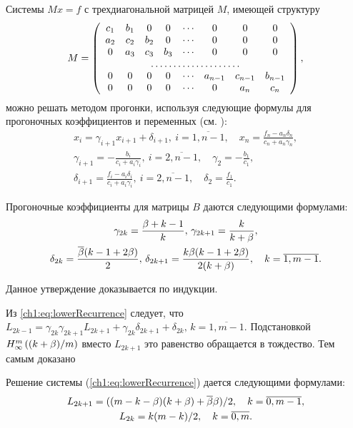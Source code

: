 {Системы $ Mx = f $ с трехдиагональной матрицей $ M $, имеющей структуру
\[
  M = \left(\begin{array}{cccccccc}
              c_1 & b_1 & 0   & 0   & \cdots & 0       & 0       & 0       \\
              a_2 & c_2 & b_2 & 0   & \cdots & 0       & 0       & 0       \\
              0   & a_3 & c_3 & b_3 & \cdots & 0       & 0       & 0       \\
              \hdotsfor{8}                                                 \\
              0   & 0   & 0   & 0   & \cdots & a_{n-1} & c_{n-1} & b_{n-1} \\
              0   & 0   & 0   & 0   & \cdots & 0       & a_n     & c_n
            \end{array}\right),
\]
можно решать методом прогонки, используя следующие формулы для прогоночных коэффициентов и переменных (см. \cite{samarsky89}):
\begin{gather}
  \label{ch1:eq:tridiagonal-book}
  x_i = \gamma_{i+1} x_{i+1} + \delta_{i+1}, \: i = \overline{1,n-1},
  \quad
  x_n = \frac{f_n - a_n\delta_n}{c_n + a_n\gamma_n}, \\
  \gamma_{i+1} = -\frac{b_i}{c_i + a_i\gamma_i}, \: i = \overline{2,
    n-1}, \quad
  \gamma_2 = -\frac{b_1}{c_1}, \\
  \delta_{i+1} = \frac{f_i - a_i\delta_i}{c_i + a_i\gamma_i}, \: i =
  \overline{2, n-1}, \quad \delta_2 = \frac{f_1}{c_1}.
\end{gather}

\begin{proposition}
  \label{ch1:prop:tridiagonal:coefficients}
  Прогоночные коэффициенты для матрицы $B$ даются следующими формулами\textup{:}
  \begin{multline*}
    \gamma_{2k} = \frac{\beta+k-1}{k}, \,
    \gamma_{2k+1} = \frac{k}{k+\beta}, \\
    \delta_{2k} = \frac{{\overline{\beta}}(k-1+2\beta)}{2}, \, \delta_{2k+1} =
    \frac{k\beta(k-1+2\beta)}{2(k+\beta)}, \quad k = \overline{1,m-1}.
  \end{multline*}
\end{proposition}
Данное утверждение доказывается по индукции.

Из \eqref{ch1:eq:lowerRecurrence} следует, что
$L_{2k-1} = \gamma_{2k}\gamma_{2k+1}L_{2k+1} + \gamma_{2k}\delta_{2k+1} + \delta_{2k}, \, k = \overline{1, m-1}$.
Подстановкой $H_{\infty}^m\left({(k+\beta)/m}\right)$ вместо $L_{2k+1}$ это равенство обращается в тождество.
Тем самым доказано
\begin{proposition}
  \label{ch1:prop:lower:recurrence-solution}
  Решение системы {\normalfont(\ref{ch1:eq:lowerRecurrence})} дается
  следующими формулами\textup{:}
  \begin{gather}
    \label{ch1:eq:recurrence-solution:odd}
    L_{2k+1} = ((m - k - \beta)(k + \beta) + {\overline{\beta}}\beta)/2, \quad k = \overline{0, m-1},\\
    \label{ch1:eq:recurrence-solution:even}
    L_{2k} = k (m-k)/2, \quad k = \overline{0, m}.
  \end{gather}
\end{proposition}

}
